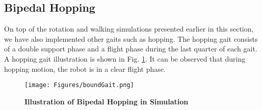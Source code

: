 \subsection{Bipedal Hopping}
On top of the rotation and walking simulations presented earlier in this section, we have also implemented other gaits such as hopping. The hopping gait consists of a double support phase and a flight phase during the last quarter of each gait. 
A hopping gait illustration is shown in Fig. \ref{fig:boundGait}. It can be observed that during hopping motion, the robot is in a clear flight phase. 

\begin{figure}%
	\center
	\texttt{[image: Figures/boundGait.png]}
	\caption{{\bfseries Illustration of Bipedal Hopping in Simulation  }  }
	\label{fig:boundGait}
\end{figure}

